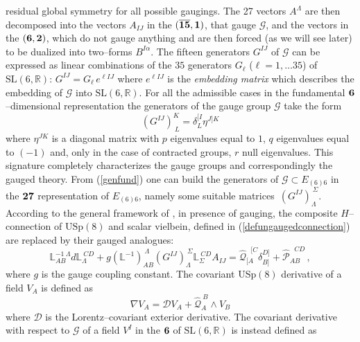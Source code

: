\documentclass[a4paper,12pt]{article}
\def\bar{\overline}\end {picture}}
\begin{document}
residual global symmetry for all possible gaugings. The 27 vectors
$A^{\Lambda}$ are then decomposed into the vectors $A_{IJ}$ in the
$\bf (\bar{15},1)$, that gauge $\mathcal{G}$, and the vectors  in
the $\bf (6,2)$, which do not gauge anything and are then forced
(as we will see later) to be dualized into two--forms
$B^{I\alpha}$. The fifteen generators $G^{IJ}$ of $\mathcal{G}$
can be expressed as linear combinations of the $35$ generators
$G_\ell$ ($\ell\!\!=\!\!1,\dots 35$) of
$\mathrm{SL}(6,\mathbb{R})$: $G^{IJ}\!=\!G_\ell \,e^{\ell IJ}$
where $e^{\ell IJ}$ is the {\it embedding matrix} \cite{noi4D}
which describes the embedding of $\mathcal{G}$ into
$\mathrm{SL}(6,\mathbb{R})$. For all the admissible cases  in the
fundamental $\bf 6$--dimensional representation the generators of
the gauge group $\mathcal{G}$ take the form \cite{gunwar}
\begin{equation}
(G^{IJ})^K_{~L}=\delta^{[I}_L\eta^{J]K}
\label{genfund}
\end{equation}
where $\eta^{JK}$ is a diagonal matrix with $p$ eigenvalues equal to $1$,
 $q$ eigenvalues equal to $(-1)$   and, only in the case of contracted groups,
  $r$  null eigenvalues. This signature completely characterizes
the gauge groups and correspondingly the
gauged theory.
From (\ref{genfund}) one can build the generators of
$\mathcal{G}\subset E_{\left(6\right)6}$ in the
$\bf 27$ representation of $E_{\left(6\right)6}$, namely
some suitable matrices $\,(G^{IJ})_{\Lambda}^{~\Sigma}$.
According to the general framework of
\cite{mylecture,castdauriafre,noi4D}, in presence of gauging,
the composite $H$--connection of $\mathrm{USp(8)}$ and scalar vielbein,
defined in (\ref{defungaugedconnection}) are replaced by their gauged analogues:
\begin{equation}
\mathbb{L}^{-1~\Lambda}_{AB}d\mathbb{L}_{\Lambda}^{~CD}+
g(\mathbb{L}^{-1})_{AB}^{~\Lambda}(G^{IJ})_{\Lambda}^{~\Sigma}\mathbb{L}_{\Sigma}^{~CD}
A_{IJ}=\hat{\mathcal{Q}}_{[A}^{~~~[C}\delta^{D]}_{B]}+\hat{\mathcal{P}}_{AB}^{~~~CD}\,,
\label{defgaugedconnection}
\end{equation}
where $g$ is the gauge coupling constant.
The covariant $\mathrm{USp(8)}$ derivative of a field $V_A$
is defined as
\begin{equation}
\nabla V_A=\mathcal{D} V_A+\hat{\mathcal{Q}}_A^{~B}\wedge V_B
\label{covQder}
\end{equation}
where $\mathcal{D}$ is the Lorentz--covariant exterior derivative.
The covariant derivative with respect to $\mathcal{G}$
of a field $V^I$ in the $\bf 6$ of $ \mathrm{SL(6, \mathbb{R})}$ is instead defined as
\end{document}
